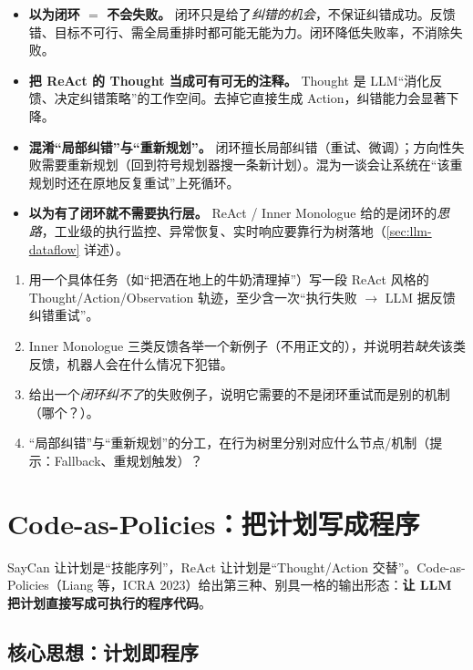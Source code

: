 \begin{pitfall}[本节常见陷阱]
\begin{itemize}
  \item \textbf{以为闭环 $=$ 不会失败。} 闭环只是给了\emph{纠错的机会}，不保证纠错成功。反馈错、目标不可行、需全局重排时都可能无能为力。闭环降低失败率，不消除失败。
  \item \textbf{把 ReAct 的 Thought 当成可有可无的注释。} Thought 是 LLM“消化反馈、决定纠错策略”的工作空间。去掉它直接生成 Action，纠错能力会显著下降。
  \item \textbf{混淆“局部纠错”与“重新规划”。} 闭环擅长局部纠错（重试、微调）；方向性失败需要重新规划（回到符号规划器搜一条新计划）。混为一谈会让系统在“该重规划时还在原地反复重试”上死循环。
  \item \textbf{以为有了闭环就不需要执行层。} ReAct / Inner Monologue 给的是闭环的\emph{思路}，工业级的执行监控、异常恢复、实时响应要靠行为树落地（\cref{sec:llm-dataflow} 详述）。
\end{itemize}
\end{pitfall}

\begin{exercise}
\begin{enumerate}
  \item 用一个具体任务（如“把洒在地上的牛奶清理掉”）写一段 ReAct 风格的 Thought/Action/Observation 轨迹，至少含一次“执行失败 $\to$ LLM 据反馈纠错重试”。
  \item Inner Monologue 三类反馈各举一个新例子（不用正文的），并说明若\emph{缺失}该类反馈，机器人会在什么情况下犯错。
  \item 给出一个\emph{闭环纠不了}的失败例子，说明它需要的不是闭环重试而是别的机制（哪个？）。
  \item “局部纠错”与“重新规划”的分工，在行为树里分别对应什么节点/机制（提示：Fallback、重规划触发）？
\end{enumerate}
\end{exercise}

\section{Code-as-Policies：把计划写成程序}
\label{sec:cap}

SayCan 让计划是“技能序列”，ReAct 让计划是“Thought/Action 交替”。Code-as-Policies（Liang 等，ICRA 2023）给出第三种、别具一格的输出形态：\textbf{让 LLM 把计划直接写成可执行的程序代码}。

\subsection{核心思想：计划即程序}
\label{sec:cap-core}

